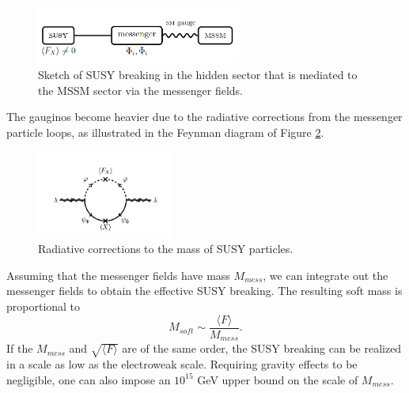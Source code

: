 \documentclass[thesis.tex]{subfiles}
\begin{document}
	\begin{figure}[!h]
		\centering
		\includegraphics[width=0.6\textwidth]{plot/GMSB.png}
		\caption{Sketch of SUSY breaking in the hidden sector that is mediated to the MSSM sector via the messenger fields.}
		\label{fig:GMSB}
	\end{figure}

The gauginos become heavier due to the radiative corrections from the messenger particle loops, as illustrated in the Feynman diagram of Figure \ref{fig:messanger}. 

\begin{figure}[!h]
	\centering
		\includegraphics[width=0.4\textwidth]{plot/mess.png}
	\caption{Radiative corrections to the mass of SUSY particles.}
	\label{fig:messanger}
\end{figure}

Assuming that the messenger fields have mass $M_{mess}$, we can integrate out the messenger fields to obtain the effective SUSY breaking. 
The resulting soft mass is proportional to
	\begin{equation}
		M_{soft} \sim \frac{ \langle F \rangle}{M_{mess}}.
	\end{equation}
If the $M_{mess}$ and $\sqrt{\langle F \rangle}$ are of the same order, the SUSY breaking can be realized in a scale as low as the electroweak scale. 
Requiring gravity effects to be negligible, one can also impose an $10^{15}$ GeV upper bound on the scale of $M_{mess}$. 
\end{document}
